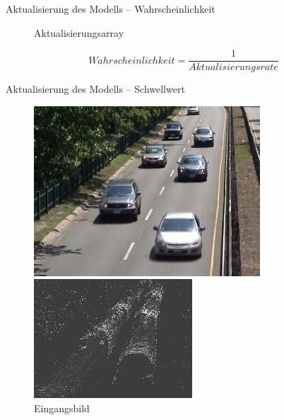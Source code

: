 \documentclass[hyperref={pdfpagelabels=false}]{beamer}
\begin{document}
\begin{frame}[t]{Aktualisierung des Modells -- Wahrscheinlichkeit}
\begin{figure}
\begin{minipage}{0.45\linewidth}
			\caption*{Aktualisierungsarray}
		\end{minipage}
	\end{figure}

	\begin{equation*}
		Wahrscheinlichkeit = \frac{1}{Aktualisierungsrate}	
	\end{equation*}

\end{frame}



\begin{frame}[t]{Aktualisierung des Modells -- Schwellwert}
	\vspace{1.65em}
	\begin{figure}
		\centering
		\begin{minipage}{0.45\linewidth}
			\includegraphics[width=1\linewidth]{Abbildungen/Eingang3.jpg}
			\caption*{Eingangsbild}
		\end{minipage}
		\begin{minipage}{0.45\linewidth}
			\includegraphics[width=1\linewidth]{Abbildungen/R2.jpg}

\end{minipage}
\end{figure}
\end{frame}
\end{document}

